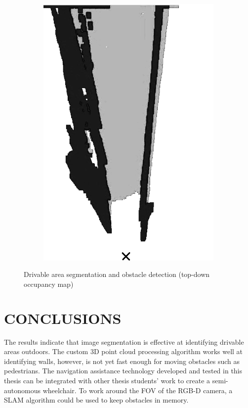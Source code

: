 \documentclass[10pt,twoside]{article}
\begin{document}
\begin{figure}[H]
\begin{subfigure}{.2\textwidth}
        \includegraphics[width=\linewidth,frame]{images/map_gs.png}
    \end{subfigure}
    \caption{Drivable area segmentation and obstacle detection (top-down occupancy map)}
    \label{fig:algorithm}
\end{figure}


\section*{\textbf{CONCLUSIONS}} %
The results indicate that image segmentation is effective at identifying drivable areas outdoors.
The custom 3D point cloud processing algorithm works well at identifying walls,
however, is not yet fast enough for moving obstacles such as pedestrians.
The navigation assistance technology developed and tested in this thesis can be integrated
with other thesis students' work to create a semi-autonomous wheelchair. To work around the FOV
of the RGB-D camera, a SLAM algorithm could be used to keep obstacles in memory.
\end{document}
